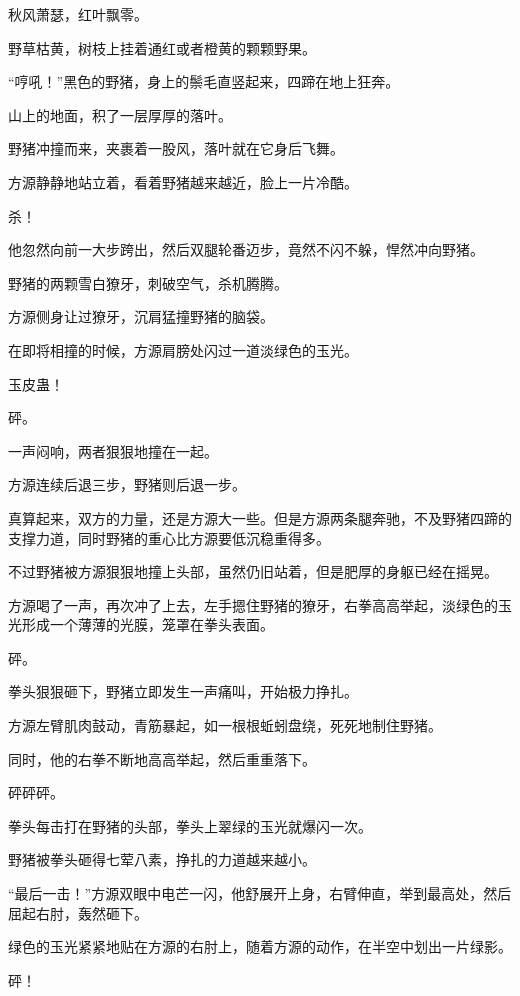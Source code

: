 
\begin{this_body}

秋风萧瑟，红叶飘零。

野草枯黄，树枝上挂着通红或者橙黄的颗颗野果。

“哼吼！”黑色的野猪，身上的鬃毛直竖起来，四蹄在地上狂奔。

山上的地面，积了一层厚厚的落叶。

野猪冲撞而来，夹裹着一股风，落叶就在它身后飞舞。

方源静静地站立着，看着野猪越来越近，脸上一片冷酷。

杀！

他忽然向前一大步跨出，然后双腿轮番迈步，竟然不闪不躲，悍然冲向野猪。

野猪的两颗雪白獠牙，刺破空气，杀机腾腾。

方源侧身让过獠牙，沉肩猛撞野猪的脑袋。

在即将相撞的时候，方源肩膀处闪过一道淡绿色的玉光。

玉皮蛊！

砰。

一声闷响，两者狠狠地撞在一起。

方源连续后退三步，野猪则后退一步。

真算起来，双方的力量，还是方源大一些。但是方源两条腿奔驰，不及野猪四蹄的支撑力道，同时野猪的重心比方源要低沉稳重得多。

不过野猪被方源狠狠地撞上头部，虽然仍旧站着，但是肥厚的身躯已经在摇晃。

方源喝了一声，再次冲了上去，左手摁住野猪的獠牙，右拳高高举起，淡绿色的玉光形成一个薄薄的光膜，笼罩在拳头表面。

砰。

拳头狠狠砸下，野猪立即发生一声痛叫，开始极力挣扎。

方源左臂肌肉鼓动，青筋暴起，如一根根蚯蚓盘绕，死死地制住野猪。

同时，他的右拳不断地高高举起，然后重重落下。

砰砰砰。

拳头每击打在野猪的头部，拳头上翠绿的玉光就爆闪一次。

野猪被拳头砸得七荤八素，挣扎的力道越来越小。

“最后一击！”方源双眼中电芒一闪，他舒展开上身，右臂伸直，举到最高处，然后屈起右肘，轰然砸下。

绿色的玉光紧紧地贴在方源的右肘上，随着方源的动作，在半空中划出一片绿影。

砰！


\end{this_body}
